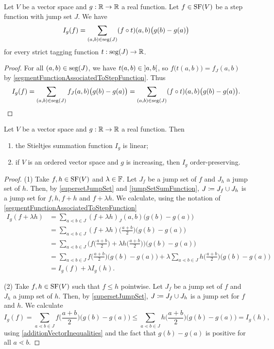 \begin{lemma}
Let $V$ be a vector space and $g: \mathbb{R}\to \mathbb{R}$ a real function. Let $f\in \operatorname{SF}(V)$ be a step function with jump set $J$. We have
\[ I_g(f) = \sum_{(a,b) \in \operatorname{seg}(J)}(f\circ t)(a,b)\big(g(b) - g(a)\big) \]
for every strict tagging function $t: \operatorname{seg}(J) \to \mathbb{R}$.
\end{lemma}
\begin{proof}
For all $(a,b) \in \operatorname{seg}(J)$, we have $t(a,b) \in \interval[o]{a,b}$, so $f\big(t(a,b)\big) = f_J(a,b)$ by \ref{segmentFunctionAssociatedToStepFunction}. Thus
\[ I_g(f) = \sum_{(a,b) \in \operatorname{seg}(J)}f_J(a,b)\big(g(b) - g(a)\big) = \sum_{(a,b) \in \operatorname{seg}(J)}(f\circ t)(a,b)\big(g(b) - g(a)\big). \]
\end{proof}

\begin{proposition}
Let $V$ be a vector space and $g: \mathbb{R}\to \mathbb{R}$ a real function. Then 
\begin{enumerate}
\item the Stieltjes summation function $I_g$ is linear;
\item if $V$ is an ordered vector space and $g$ is increasing, then $I_g$ order-preserving.
\end{enumerate}
\end{proposition}
\begin{proof}
(1) Take $f,h\in \operatorname{SF}(V)$ and $\lambda\in \mathbb{F}$. Let $J_f$ be a jump set of $f$ and $J_h$ a jump set of $h$. Then, by \ref{supersetJumpSet} and \ref{jumpSetSumFunction}, $J \coloneqq J_f\cup J_h$ is a jump set for $f,h, f+h$ and $f+\lambda h$. We calculate, using the notation of \ref{segmentFunctionAssociatedToStepFunction}
\begin{align*}
I_g(f+\lambda h) &= \sum_{a \lessdot b\in J} (f + \lambda h)_J(a,b)\big(g(b) - g(a)\big) \\
&= \sum_{a \lessdot b\in J} (f + \lambda h)\Big(\frac{a + b}{2}\Big)\big(g(b) - g(a)\big) \\
&= \sum_{a \lessdot b\in J} \bigg(f\Big(\frac{a + b}{2}\Big) + \lambda h\Big(\frac{a + b}{2}\Big)\bigg)\big(g(b) - g(a)\big) \\
&= \sum_{a \lessdot b\in J} f\Big(\frac{a + b}{2}\Big)\big(g(b) - g(a)\big) + \lambda \sum_{a \lessdot b\in J} h\Big(\frac{a + b}{2}\Big)\big(g(b) - g(a)\big) \\
&= I_g(f) + \lambda I_g(h).
\end{align*}

(2) Take $f,h\in \operatorname{SF}(V)$ such that $f \leq h$ pointwise. Let $J_f$ be a jump set of $f$ and $J_h$ a jump set of $h$. Then, by \ref{supersetJumpSet}, $J \coloneqq J_f\cup J_h$ is a jump set for $f$ and $h$. We calculate
\[ I_g(f) = \sum_{a \lessdot b\in J} f\Big(\frac{a + b}{2}\Big)\big(g(b) - g(a)\big) \leq \sum_{a \lessdot b\in J} h\Big(\frac{a + b}{2}\Big)\big(g(b) - g(a)\big) = I_g(h), \]
using \ref{additionVectorInequalities} and the fact that $g(b) - g(a)$ is positive for all $a \lessdot b$.
\end{proof}

